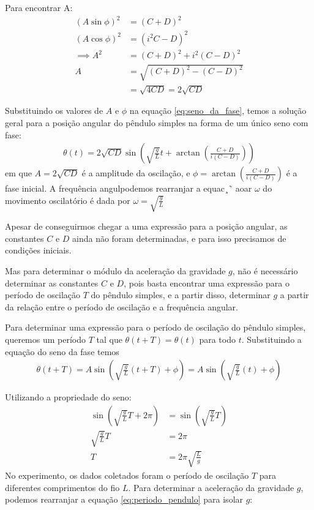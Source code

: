 \documentclass[12pt,a4paper]{article}
\begin{document}
Para encontrar A:
\begin{align*}
\left(A\sin\phi \right)^2 &= \left( { C + D } \right)^2 \\ 
\left(A\cos\phi \right)^2 &= \left( { i^2 C - D} \right)^2 \\
\implies A^2 &= \left( {C + D} \right)^2 + i^2 \left( {C - D} \right)^2 \\
A &= \sqrt{\left( {C + D} \right)^2 - \left( {C - D} \right)^2} \\
&= \sqrt{4CD} = 2 \sqrt{CD}
\end{align*}

Substituindo os valores de $A$ e $\phi$ na equação \eqref{eq:seno_da_fase}, temos a solução geral para a posição angular do pêndulo simples na forma de um único seno com fase:
\begin{align*}
\theta(t) = 2 \sqrt{CD} \sin\left(\sqrt{\frac{g}{L}} t + \arctan\left(\frac{C + D}{i (C - D)}\right)\right)
\end{align*}
em que $A = 2 \sqrt{CD}$ é a amplitude da oscilação, e $\phi = \arctan\left(\frac{C + D}{i (C - D)}\right)$ é a fase inicial. A frequência angulpodemos rearranjar a equac¸˜ aoar $\omega$ do movimento oscilatório é dada por $\omega = \sqrt{\frac{g}{L}}$

Apesar de conseguirmos chegar a uma expressão para a posição angular, as constantes $C$ e $D$ ainda não foram determinadas, e para isso precisamos de condições iniciais.

Mas para determinar o módulo da aceleração da gravidade $g$, não é necessário determinar as constantes $C$ e $D$, pois basta encontrar uma expressão para o período de oscilação $T$ do pêndulo simples, e a partir disso, determinar $g$ a partir da relação entre o período de oscilação e a frequência angular.

Para determinar uma expressão para o período de oscilação do pêndulo simples, queremos um período $T$ tal que $\theta(t + T) = \theta(t)$ para todo $t$. Substituindo a equação do seno da fase temos
\begin{align*}
\theta(t + T) = A\sin\left(\sqrt{\frac{g}{L}} (t + T) + \phi\right) = A\sin\left(\sqrt{\frac{g}{L}} (t) + \phi\right)
\end{align*}

Utilizando a propriedade do seno:
\begin{align}
\sin\left(\sqrt{\frac{g}{L}} T + 2\pi\right) &= \sin\left(\sqrt{\frac{g}{L}} T\right) \nonumber \\
\sqrt{\frac{g}{L}} T &= 2\pi \nonumber \\
T &= 2\pi \sqrt{\frac{L}{g}} \label{eq:periodo_pendulo}
\end{align}
No experimento, os dados coletados foram o período de oscilação $T$ para diferentes comprimentos do fio $L$. Para determinar a aceleração da gravidade $g$, podemos rearranjar a equação \eqref{eq:periodo_pendulo} para isolar $g$:
\end{document}
